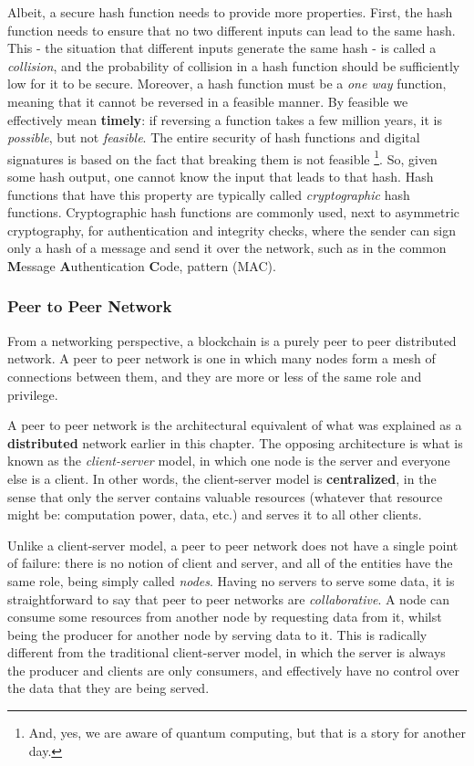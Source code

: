 Albeit, a secure hash function needs to provide more properties. First, the hash function needs to
ensure that no two different inputs can lead to the same hash. This - the situation that different
inputs generate the same hash - is called a \textit{collision}, and the probability of collision in
a hash function should be sufficiently low for it to be secure. Moreover, a hash function must be a
\textit{one way} function, meaning that it cannot be reversed in a feasible manner. By feasible we
effectively mean \textbf{timely}: if reversing a function takes a few million years, it is
\textit{possible}, but not \textit{feasible}. The entire security of hash functions and digital
signatures is based on the fact that breaking them is not feasible \footnote{And, yes, we are aware
of quantum computing, but that is a story for another day.}. So, given some hash output, one cannot
know the input that leads to that hash. Hash functions that have this property are typically called
\textit{cryptographic} hash functions. Cryptographic hash functions are commonly used, next to
asymmetric cryptography, for authentication and integrity checks, where the sender can sign only a
hash of a message and send it over the network, such as in the common \textbf{M}essage
\textbf{A}uthentication \textbf{C}ode, pattern \cite{bellareKeyingHashFunctions1996} (MAC).

\subsubsection{Peer to Peer Network} \label{chap_bg:subsec:p2p}

From a networking perspective, a blockchain is a purely peer to peer distributed network. A peer to
peer network is one in which many nodes form a mesh of connections between them, and they are more
or less of the same role and privilege.

A peer to peer network is the architectural equivalent of what was explained as a
\textbf{distributed} network earlier in this chapter. The opposing architecture is what is known as
the \textit{client-server} model, in which one node is the server and everyone else is a client. In
other words, the client-server model is \textbf{centralized}, in the sense that only the server
contains valuable resources (whatever that resource might be: computation power, data, etc.) and
serves it to all other clients.

Unlike a client-server model, a peer to peer network does not have a single point of failure: there
is no notion of client and server, and all of the entities have the same role, being simply called
\textit{nodes}. Having no servers to serve some data, it is straightforward to say that peer to peer
networks are \textit{collaborative}. A node can consume some resources from another node by
requesting data from it, whilst being the producer for another node by serving data to it. This is
radically different from the traditional client-server model, in which the server is always the
producer and clients are only consumers, and effectively have no control over the data that they are
being served.

